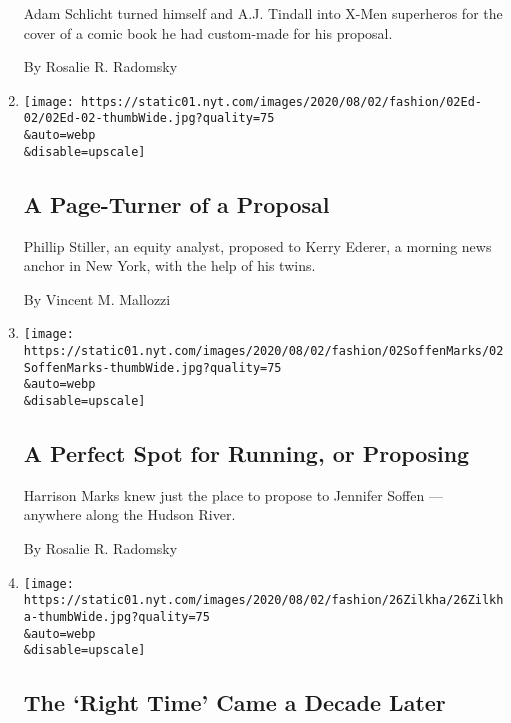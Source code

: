 \begin{enumerate}
  Adam Schlicht turned himself and A.J. Tindall into X-Men superheros
  for the cover of a comic book he had custom-made for his proposal.

  By Rosalie R. Radomsky
\item
  \href{/2020/07/31/fashion/weddings/a-page-turner-of-a-proposal.html}{}

  \texttt{[image: https://static01.nyt.com/images/2020/08/02/fashion/02Ed-02/02Ed-02-thumbWide.jpg?quality=75\\\&auto=webp\\\&disable=upscale]}

  \hypertarget{a-page-turner-of-a-proposal}{%
  \subsection{A Page-Turner of a
  Proposal}\label{a-page-turner-of-a-proposal}}

  Phillip Stiller, an equity analyst, proposed to Kerry Ederer, a
  morning news anchor in New York, with the help of his twins.

  By Vincent M. Mallozzi
\item
  \href{/2020/07/31/fashion/weddings/a-perfect-spot-for-running-or-proposing.html}{}

  \texttt{[image: https://static01.nyt.com/images/2020/08/02/fashion/02SoffenMarks/02SoffenMarks-thumbWide.jpg?quality=75\\\&auto=webp\\\&disable=upscale]}

  \hypertarget{a-perfect-spot-for-running-or-proposing}{%
  \subsection{A Perfect Spot for Running, or
  Proposing}\label{a-perfect-spot-for-running-or-proposing}}

  Harrison Marks knew just the place to propose to Jennifer Soffen ---
  anywhere along the Hudson River.

  By Rosalie R. Radomsky
\item
  \href{/2020/07/31/fashion/weddings/the-right-time-came-a-decade-later.html}{}

  \texttt{[image: https://static01.nyt.com/images/2020/08/02/fashion/26Zilkha/26Zilkha-thumbWide.jpg?quality=75\\\&auto=webp\\\&disable=upscale]}

  \hypertarget{the-right-time-came-a-decade-later}{%
  \subsection{The `Right Time' Came a Decade
  Later}\label{the-right-time-came-a-decade-later}}


\end{enumerate}

